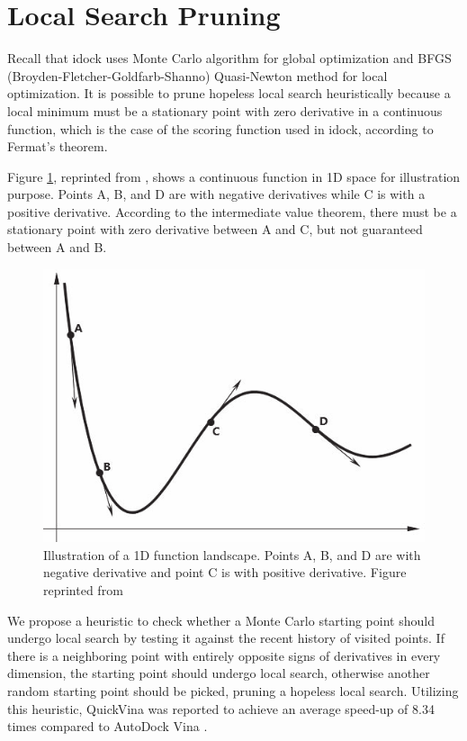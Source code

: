 \section{Local Search Pruning}

Recall that idock uses Monte Carlo algorithm for global optimization and BFGS (Broyden-Fletcher-Goldfarb-Shanno) Quasi-Newton method \cite{786} for local optimization. It is possible to prune hopeless local search heuristically because a local minimum must be a stationary point with zero derivative in a continuous function, which is the case of the scoring function used in idock, according to Fermat’s theorem.

Figure \ref{idock:FunctionLandscape}, reprinted from \citep{1193}, shows a continuous function in 1D space for illustration purpose. Points A, B, and D are with negative derivatives while C is with a positive derivative. According to the intermediate value theorem, there must be a stationary point with zero derivative between A and C, but not guaranteed between A and B.

\begin{figure}
\centering
\includegraphics[width=\textwidth]{idock/FunctionLandscape.png}
\caption{Illustration of a 1D function landscape. Points A, B, and D are with negative derivative and point C is with positive derivative. Figure reprinted from \citep{1193}}
\label{idock:FunctionLandscape}
\end{figure}

We propose a heuristic to check whether a Monte Carlo starting point should undergo local search by testing it against the recent history of visited points. If there is a neighboring point with entirely opposite signs of derivatives in every dimension, the starting point should undergo local search, otherwise another random starting point should be picked, pruning a hopeless local search. Utilizing this heuristic, QuickVina \citep{1193} was reported to achieve an average speed-up of 8.34 times compared to AutoDock Vina \citep{595}.

